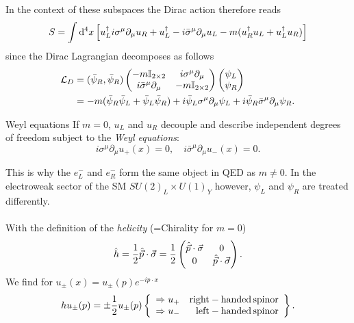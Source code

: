 In the context of these subspaces the Dirac action therefore reads
\begin{equation}
	S = \int \mathrm{d}^4 x \left[u^{\dagger}_L i \sigma^{\mu} \partial_{\mu} u_R + u^{\dagger}_L- i \bar{\sigma}^{\mu} \partial_{\mu} u_L -m(u^{\dagger}_R u_L+ u^{\dagger}_L u_R) \right]
\end{equation}
since the Dirac Lagrangian decomposes as follows
\begin{align*}
	\mathcal{L}_D &= (\bar{ \psi}_R, \bar{\psi}_R) \begin{pmatrix}
		-m \mathbb{I}_{2\times 2} & i \sigma^\mu \partial_\mu \\
		i \bar{\sigma}^\mu \partial_\mu & -m \mathbb{I}_{2\times 2}\\
	\end{pmatrix}
\begin{pmatrix}
	\psi_L\\
	\psi_R\\
\end{pmatrix}
\\
&= -m (\bar{\psi}_R \bar{\psi}_L + \bar{ \psi}_L \bar{ \psi}_R) + i \bar{ \psi}_L \sigma^\mu \partial_\mu \psi_L + i \bar{ \psi}_R \bar{ \sigma }^\mu \partial_\mu \psi_R.
\end{align*}
\begin{mybox}{Weyl equations}
	If $m=0$, $u_L$ and $u_R$ decouple and describe independent degrees of freedom subject to the \emph{Weyl equations}:
	\begin{equation}
		i \sigma^{\mu} \partial_{\mu} u_+ (x) = 0, \quad i\bar{\sigma}^{\mu} \partial_{\mu} u_-(x)=0.
	\end{equation}
\end{mybox}
This is why the $e^-_L$ and $e^-_R$ form the same object in QED as $m\neq 0$. In the electroweak sector of the SM $SU(2)_L\times U(1)_Y$ however, $\psi_L$ and $\psi_R$ are treated differently.\\
\\
With the definition of the \emph{helicity} (=Chirality for $m=0$) 
\begin{equation}
	\hat{h} = \frac{1}{2} \hat{\vec{p}} \cdot \vec{\sigma} = \frac{1}{2} \begin{pmatrix}
	\hat{\vec{p}} \cdot \vec{\sigma } &0 \\
	0 & \hat{\vec{p}} \cdot \vec{\sigma}
	\end{pmatrix}.
\end{equation}
We find for $u_{\pm}(x) = u_{\pm}(p) e^{-i p\cdot x}$ 
\begin{equation}
	h u_{\pm} (p) = \pm \frac{1}{2} u_{\pm} (p) \left\{	\begin{array}{lr}
	\Rightarrow u_+ & \mathrm{right-handed \, spinor} \\
	\Rightarrow u_- & \mathrm{left-handed \, spinor}
	\end{array}			\right\}.
\end{equation}




